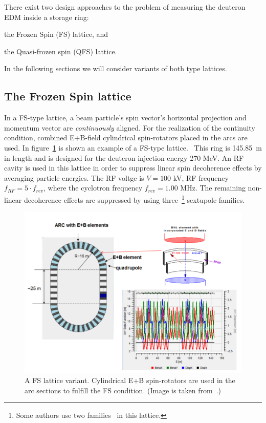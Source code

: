 
There exist two design approaches to the problem of measuring the deuteron EDM inside a storage ring:
\begin{enumerate*}
	\item the Frozen Spin (FS) lattice, and
	\item the Quasi-frozen spin (QFS) lattice.
\end{enumerate*}

In the following sections we will consider variants of both type lattices.

\subsection{The Frozen Spin lattice} \label{chpt2:lattice:FS_BNL}
In a FS-type lattice, a beam particle's spin vector's horizontal projection and momentum vector
are \emph{continuously} aligned. For the realization of the continuity condition, combined E+B-field
cylindrical spin-rotators placed in the arcs are used. In figure~\ref{fig:BNL_lattice} is shown an example of a
FS-type lattice.~\cite{Senichev:Lattices} This ring is 145.85~m in length and is designed for the deuteron
injection energy 270 MeV. An RF cavity is used in this lattice in order to suppress linear spin decoherence
effects by averaging particle energies. The RF voltge is $V = 100$ kV, RF frequency $f_{RF} = 5\cdot f_{rev}$,
where the cyclotron frequency $f_{rev} = 1.00$ MHz. The remaining non-linear decoherence effects are
suppressed by using three~\footnote{Some authors use two families~\cite{Eremey:Thesis} in this lattice.}
sextupole families.

\begin{figure}[h!]
	\centering
	\includegraphics[width=\linewidth]{images/chapter2/BNL_lattice}
	\caption{A FS lattice variant. Cylindrical E+B spin-rotators are used in the arc sections to fulfill
          the FS condition. (Image is taken from~\cite{Senichev:Lattices}.)\label{fig:BNL_lattice}}
\end{figure}

